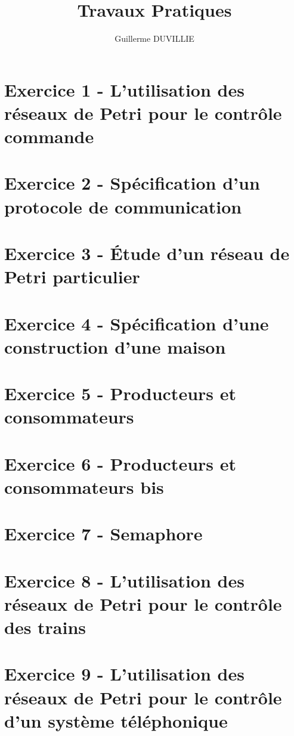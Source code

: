 \documentclass[a4paper,11pt]{article}
\author{}
\title{}
\title{Travaux Pratiques}
\author{Guillerme DUVILLIE}
\begin{document}
\maketitle

\section{Exercice 1 - L'utilisation des réseaux de Petri pour le contrôle commande}



\section{Exercice 2 - Spécification d'un protocole de communication}



\section{Exercice 3 - Étude d'un réseau de Petri particulier}



\section{Exercice 4 - Spécification d'une construction d'une maison}



\section{Exercice 5 - Producteurs et consommateurs}



\section{Exercice 6 - Producteurs et consommateurs bis}

\section{Exercice 7 - Semaphore}

\section{Exercice 8 - L'utilisation des réseaux de Petri pour le contrôle des trains}



\section{Exercice 9 - L'utilisation des réseaux de Petri pour le contrôle d'un système téléphonique}


\end{document}
